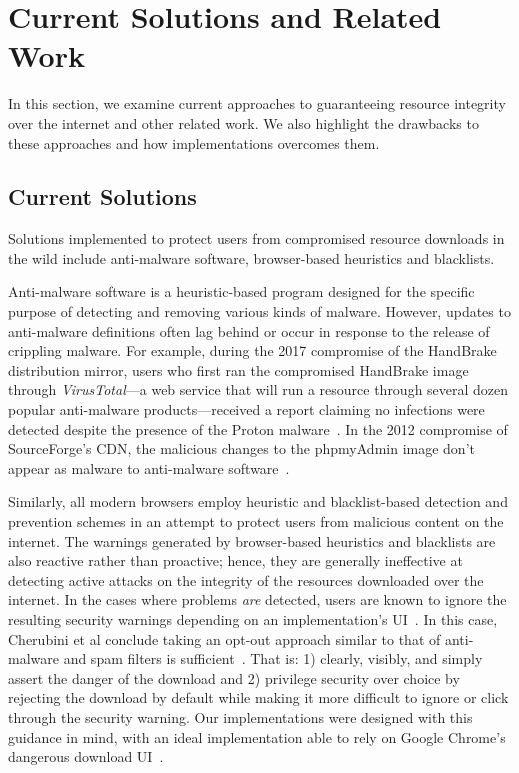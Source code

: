\section{Current Solutions and Related Work} \label{sec:related}

In this section, we examine current approaches to guaranteeing resource
integrity over the internet and other related work. We also highlight the
drawbacks to these approaches and how \SYSTEM{} implementations overcomes them.

\subsection{Current Solutions}

Solutions implemented to protect users from compromised resource downloads in
the wild include anti-malware software, browser-based heuristics and blacklists.

Anti-malware software is a heuristic-based program designed for the specific
purpose of detecting and removing various kinds of malware. However, updates to
anti-malware definitions often lag behind or occur in response to the release of
crippling malware. For example, during the 2017 compromise of the HandBrake
distribution mirror, users who first ran the compromised HandBrake image through
\textit{VirusTotal}---a web service that will run a resource through several
dozen popular anti-malware products---received a report claiming no infections
were detected despite the presence of the Proton malware~\cite{SCA-HB1}. In the
2012 compromise of SourceForge's CDN, the malicious changes to the phpmyAdmin
image don't appear as malware to anti-malware software~\cite{SCA-PMA1}.

Similarly, all modern browsers employ heuristic and blacklist-based detection
and prevention schemes in an attempt to protect users from malicious content on
the internet. The warnings generated by browser-based heuristics and blacklists
are also reactive rather than proactive; hence, they are generally
ineffective at detecting active attacks on the integrity of the resources
downloaded over the internet. In the cases where problems \emph{are} detected,
users are known to ignore the resulting security warnings depending on an
implementation's UI~\cite{Clickthrough, Modic, Akhawe, ChromeClickThrough}. In
this case, Cherubini et al conclude taking an opt-out approach similar to that
of anti-malware and spam filters is sufficient~\cite{Cherubini}. That is: 1)
clearly, visibly, and simply assert the danger of the download and 2) privilege
security over choice by rejecting the download by default while making it more
difficult to ignore or click through the security warning. Our \SYSTEM{}
implementations were designed with this guidance in mind, with an ideal
implementation able to rely on Google Chrome's dangerous download
UI~\cite{ChromeClickThrough}.

